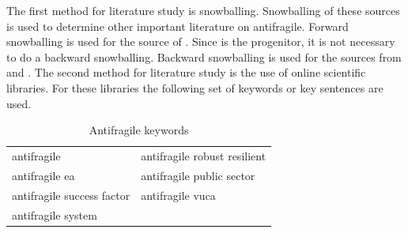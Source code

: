 The first method for literature study is snowballing. Snowballing of these sources is used to determine other important literature on \gls{antifragile}. Forward snowballing is used for the source of \citeauthor{Taleb2012}. Since \citeauthor{Taleb2012} is the progenitor, it is not necessary to do a backward snowballing. Backward snowballing is used for the sources from \citeauthor{Botjes2020} and \citeauthor{OReilly2019}. The second method for literature study is the use of online scientific libraries. For these libraries the following set of keywords or key sentences are used.
\begin{table}[H]
	\centering
	\begin{tabular}{p{}p{}}
		\toprule
		\gls{antifragile} & \gls{antifragile} \gls{robust} \gls{resilient}\\%
		\gls{antifragile} \acrlong{ea}	& \gls{antifragile} public sector\\%
		\gls{antifragile} success factor & \gls{antifragile} \acrshort{vuca} \\%
		\gls{antifragile} system & \\%
		\bottomrule
	\end{tabular}
	\caption[Antifragile keywords]{Antifragile keywords}
	\label{tab:antifragilekeywords}
\end{table}
